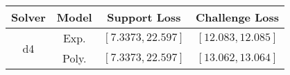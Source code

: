 \begin{tabular}{cc|c|c} 
\hline 
 Solver & Model & Support Loss  & Challenge Loss \tabularnewline\hline 
\hline 
\multirow{2}{*}{d4} & Exp. & $\mathbf{\left[7.3373,22.597\right]}$ & $\mathbf{\left[12.083,12.085\right]}$ \tabularnewline 
 & Poly. & $\left[7.3373,22.597\right]$ & $\left[13.062,13.064\right]$ \tabularnewline 
\hline 
\end{tabular} 

